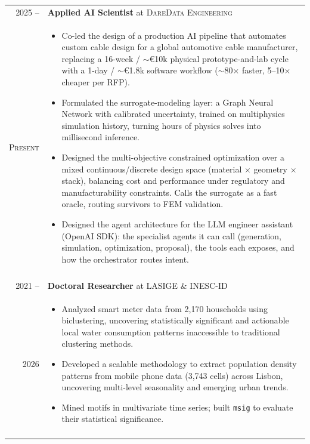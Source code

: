 \documentclass[a4paper,10pt]{article}
\begin{document}
\begin{tabularx}{\linewidth}{r|X}

\textsc{2025 --} & \textbf{Applied AI Scientist} at \textsc{DareData Engineering} \\
\textsc{Present} &
\begin{itemize}[leftmargin=*, itemsep=1pt, topsep=0pt, partopsep=0pt]
  \item Co-led the design of a production AI pipeline that automates custom cable design for a global automotive cable manufacturer, replacing a 16-week / $\sim$€10k physical prototype-and-lab cycle with a 1-day / $\sim$€1.8k software workflow ($\sim$80$\times$ faster, 5--10$\times$ cheaper per RFP).
  \item Formulated the surrogate-modeling layer: a Graph Neural Network with calibrated uncertainty, trained on multiphysics simulation history, turning hours of physics solves into millisecond inference.
  \item Designed the multi-objective constrained optimization over a mixed continuous/discrete design space (material $\times$ geometry $\times$ stack), balancing cost and performance under regulatory and manufacturability constraints. Calls the surrogate as a fast oracle, routing survivors to FEM validation.
  \item Designed the agent architecture for the LLM engineer assistant (OpenAI SDK): the specialist agents it can call (generation, simulation, optimization, proposal), the tools each exposes, and how the orchestrator routes intent.
\end{itemize} \\
& \\[-6pt]

\textsc{2021 --} & \textbf{Doctoral Researcher} at \textsc{LASIGE \& INESC-ID} \\
\textsc{2026} & 
\begin{itemize}[leftmargin=*, itemsep=1pt, topsep=0pt, partopsep=0pt]
  \item  Analyzed smart meter data from 2,170 households using biclustering, uncovering statistically significant and actionable local water consumption patterns inaccessible to traditional clustering methods.
  \item Developed a scalable methodology to extract  population density patterns from mobile phone data (3,743 cells) across Lisbon, uncovering multi-level seasonality and emerging urban trends.%
  \item Mined motifs in multivariate time series; built \texttt{msig} to evaluate their statistical significance.
\end{itemize} \\
& \\[-6pt]


\end{tabularx}
\end{document}
